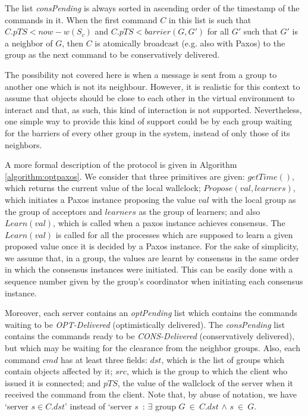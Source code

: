 \documentclass[times, 10pt]{article}
\begin{document}
The list \textit{consPending} is always sorted in ascending order of the timestamp of the commands in it. When the first command $C$ in this list is such that $C.pTS < now - w(S_c)$ and $C.pTS < barrier(G, G')$ for all $G'$ such that $G'$ is a neighbor of $G$, then $C$ is atomically broadcast (e.g. also with Paxos) to the group as the next command to be conservatively delivered. 

The possibility not covered here is when a message is sent from a group to another one which is not its neighbour. However, it is realistic for this context to assume that objects should be close to each other in the virtual environment to interact and that, as such, this kind of interaction is not supported. Nevertheless, one simple way to provide this kind of support could be by each group waiting for the barriers of every other group in the system, instead of only those of its neighbors.

A more formal description of the protocol is given in Algorithm \ref{algorithm:optpaxos}. We consider that three primitives are given: $getTime()$, which returns the current value of the local wallclock; $Propose(val, learners)$, which initiates a Paxos \cite{paxosref} instance proposing the value $val$ with the local group as the group of acceptors and $learners$ as the group of learners; and also $Learn(val)$, which is called when a paxos instance achieves consensus. The $Learn(val)$ is called for all the processes which are supposed to learn a given proposed value once it is decided by a Paxos instance. For the sake of simplicity, we assume that, in a group, the values are learnt by consensus in the same order in which the consensus instances were initiated. This can be easily done with a sequence number given by the group's coordinator when initiating each consensus instance.

Moreover, each server contains an \textit{optPending} list which contains the commands waiting to be \textit{OPT-Delivered} (optimistically delivered). The \mbox{\textit{consPending}} list contains the commands ready to be \textit{CONS-Delivered} (conservatively delivered), but which may be waiting for the clearance from the neighbor groups. Also, each command $cmd$ has at least three fields: $dst$, which is the list of groups which contain objects affected by it; $src$, which is the group to which the client who issued it is connected; and $pTS$, the value of the wallclock of the server when it received the command from the client. Note that, by abuse of notation, we have `server $s \in C.dst$' instead of `server $s$~: $\exists$ group $G~\in~C.dst$ $\wedge$ $s~\in~G$.
\end{document}

